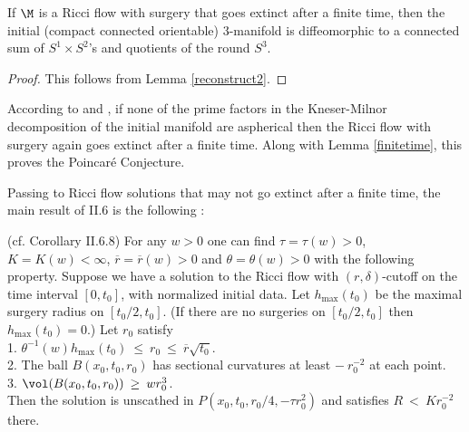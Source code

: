 \begin{lemma}
  \label{lem:kl-double-sided-curvature-bound-thick-part-compactness-ricci-flow-surgery}
 \label{finitetime}
If $\M$ is a Ricci flow with surgery that goes extinct after a finite time,
then the initial (compact connected orientable) $3$-manifold is diffeomorphic to a
connected sum of $S^1 \times S^2$'s and quotients of the round
$S^3$.
\end{lemma}
\begin{proof}
This follows from Lemma  \ref{reconstruct2}.
\end{proof}

According to \cite{Colding-Minicozzi,Colding-Minicozzi2} and
\cite{Perelman3}, if
none of the prime factors in the Kneser-Milnor decomposition of
the initial manifold are aspherical
then the Ricci flow with surgery again goes extinct
after a finite time.
Along with Lemma \ref{finitetime}, this proves the
Poincar\'e Conjecture.

Passing to Ricci flow solutions that may not go extinct after a finite time,
the main result of II.6 is the following :

\begin{corollary}
  \label{cor:kl-double-sided-curvature-bound-thick-part-existence-ricci-flow-surgery}
 \label{II.6.8}
(cf. Corollary II.6.8) For any $w > 0$ one can find
$\tau = \tau(w) > 0$, $K = K(w) < \infty$,
$\overline{r} = \overline{r}(w) > 0$ and $\theta = \theta(w) > 0$ with
the following property. Suppose we have a solution to the Ricci flow
with $(r, \delta)$-cutoff on the time interval $[0, t_0]$, with
normalized initial data.
Let $h_{\max}(t_0)$ be the maximal surgery radius on $[t_0/2, t_0]$.
(If there are no surgeries on $[t_0/2, t_0]$ then $h_{\max}(t_0) = 0$.)
Let $r_0$ satisfy \\
1. $\theta^{-1}(w) h_{\max}(t_0) \: \le \: r_0 \: \le \:
\overline{r} \sqrt{t_0}$.\\
2. The ball $B(x_0, t_0, r_0)$ has sectional curvatures at least
$- \: r_0^{-2}$ at each point.\\
3. $\vol(B(x_0, t_0, r_0)) \: \ge \: w r_0^3$.\\

Then the solution is unscathed in $P(x_0, t_0, r_0/4, - \tau r_0^2)$
and satisfies $R \: < \: Kr_0^{-2}$ there.
\end{corollary}

